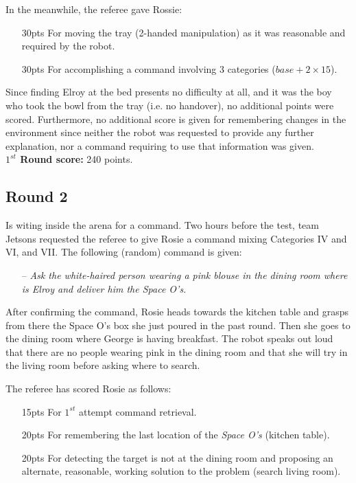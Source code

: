 In the meanwhile, the referee gave Rossie:
\begin{itemize}
	\item[30pts] For moving the tray (2-handed manipulation) as it was reasonable and required by the robot.
	\item[30pts] For accomplishing a command involving 3 categories ($base + 2\times15$).
\end{itemize}

Since finding Elroy at the bed presents no difficulty at all, and it was the boy who took the bowl from the tray (i.e. no handover), no additional points were scored. Furthermore, no additional score is given for remembering changes in the environment since neither the robot was requested to provide any further explanation, nor a command requiring to use that information was given. \\

\textbf{$1^{st}$ Round score:} 240 points.

\subsection{Round 2}
Is witing inside the arena for a command. Two hours before the test, team Jetsons requested the referee to give Rosie a command mixing Categories IV and VI, and VII. The following (random) command is given:

\begin{itemize}
	\item[--] \textit{Ask the white-haired person wearing a pink blouse in the dining room where is Elroy and deliver him the Space O's.}
\end{itemize}

After confirming the command, Rosie heads towards the kitchen table and grasps from there the Space O's box she just poured in the past round. Then she goes to the dining room where George is having breakfast. The robot speaks out loud that there are no people wearing pink in the dining room and that she will try in the living room before asking where to search.

The referee has scored Rosie as follows:
\begin{itemize}
	\item[15pts] For $1^{st}$ attempt command retrieval.
	\item[20pts] For remembering the last location of the \textit{Space O's} (kitchen table).
	\item[20pts] For detecting the target is not at the dining room and proposing an alternate, reasonable, working solution to the problem (search living room).
\end{itemize}

